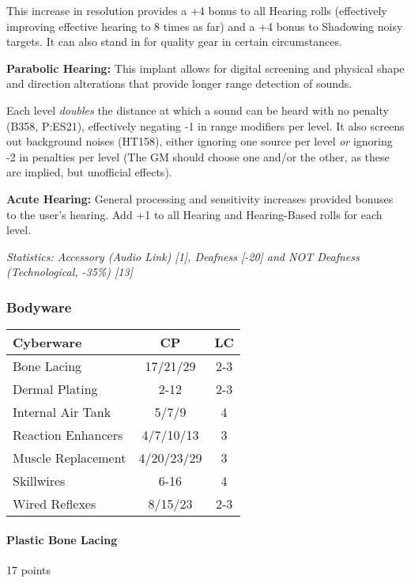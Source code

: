 \begin{multicols*}{3}
	This increase in resolution provides a +4 bonus to all Hearing rolls (effectively improving effective hearing to 8 times as far) and a +4 bonus to Shadowing noisy targets. It can also stand in for quality gear in certain circumstances.
	
	\textbf{Parabolic Hearing:} This implant allows for digital screening and physical shape and direction alterations that provide longer range detection of sounds.	
	
	Each level \textit{doubles} the distance at which a sound can be heard with no penalty (B358, P:ES21), effectively negating -1 in range modifiers per level. It also screens out background noises (HT158), either ignoring one source per level \textit{or} ignoring -2 in penalties per level (The GM should choose one and/or the other, as these are implied, but unofficial effects).
	
	\textbf{Acute Hearing:} General processing and sensitivity increases provided bonuses to the user's hearing. Add +1 to all Hearing and Hearing-Based rolls for each level.
	
	\textit{\textcolor{OliveGreen}{Statistics: Accessory (Audio Link) [1], Deafness [-20] and NOT Deafness (Technological, -35\%) [13]}}
	
	\subsubsection{Bodyware}
	
	\begin{center}
		\begin{tabularx}{0.32\textwidth}{|X|c|c|}
			\hline
			Cyberware & CP & LC\\
			\hline
			\hline
			Bone Lacing & 17/21/29 & 2-3 \\
			Dermal Plating & 2-12 & 2-3 \\
			Internal Air Tank & 5/7/9 & 4 \\
			Reaction Enhancers & 4/7/10/13 & 3 \\
			Muscle Replacement & 4/20/23/29 & 3 \\
			Skillwires & 6-16 & 4 \\
			Wired Reflexes & 8/15/23 & 2-3 \\
			\hline
		\end{tabularx}
	\end{center}
		
	\paragraph{Plastic Bone Lacing}
	\begin{flushright}
		17 points
	\end{flushright}
	

\end{multicols*}

